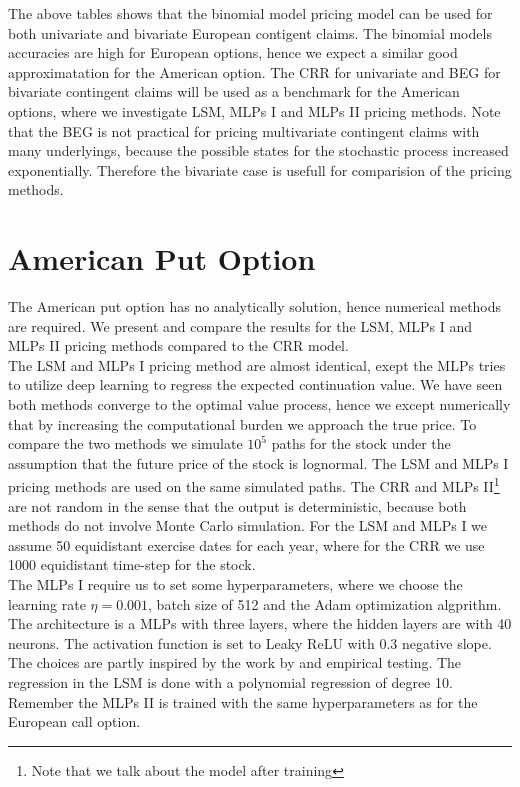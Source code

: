 The above tables shows that the binomial model pricing model can be used for both univariate and bivariate European contigent claims. The binomial models accuracies are high for European options, hence we expect a similar good approximatation for the American option. The CRR for univariate and BEG for bivariate contingent claims will be used as a benchmark for the American options, where we investigate LSM, MLPs I and MLPs II pricing methods. Note that the BEG is not practical for pricing multivariate contingent claims with many underlyings, because the possible states for the stochastic process increased exponentially. Therefore the bivariate case is usefull for comparision of the pricing methods.
\section{American Put Option}
The American put option has no analytically solution, hence numerical methods are required. We present and compare the results for the LSM, MLPs I and MLPs II pricing methods compared to the CRR model.\\

The LSM and MLPs I pricing method are almost identical, exept the MLPs tries to utilize deep learning to regress the expected continuation value. We have seen both methods converge to the optimal value process, hence we except numerically that by increasing the computational burden we approach the true price. To compare the two methods we simulate $10^5$ paths for the stock under the assumption that the future price of the stock is lognormal. The LSM and MLPs I pricing methods are used on the same simulated paths. The CRR and MLPs II\footnote{Note that we talk about the model after training} are not random in the sense that the output is deterministic, because both methods do not involve Monte Carlo simulation. For the LSM and MLPs I we assume 50 equidistant exercise dates for each year, where for the CRR we use 1000 equidistant time-step for the stock.  \\

The MLPs I require us to set some hyperparameters, where we choose the learning rate $\eta=0.001$, batch size of 512 and the Adam optimization algprithm. The architecture is a MLPs with three layers, where the hidden layers are with 40 neurons. The activation function is set to Leaky ReLU with 0.3 negative slope. The choices are partly inspired by the work by \parencite{Lelong19} and empirical testing. The regression in the LSM is done with a polynomial regression of degree 10. Remember the MLPs II is trained with the same hyperparameters as for the European call option.\\

